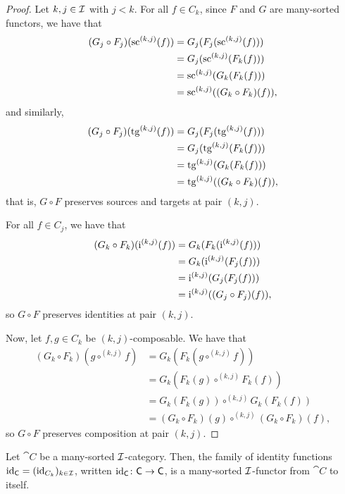 \begin{proof}
  \leanok
  Let $k, j \in \mathcal{I}$ with $j < k$. For all $f \in C_k$, since $F$ and $G$ are many-sorted
  functors, we have that
  \[
    \begin{split}
      (G_j \circ F_j) (\operatorname{sc}^{(k,j)} (f))
      & = G_j (F_j (\operatorname{sc}^{(k,j)} (f))) \\
      & = G_j (\operatorname{sc}^{(k,j)} (F_k (f))) \\
      & = \operatorname{sc}^{(k,j)} (G_k (F_k (f))) \\
      & = \operatorname{sc}^{(k,j)} ((G_k \circ F_k) (f)),
    \end{split}
  \]
  and similarly,
  \[
    \begin{split}
      (G_j \circ F_j) (\operatorname{tg}^{(k,j)} (f))
      & = G_j (F_j (\operatorname{tg}^{(k,j)} (f))) \\
      & = G_j (\operatorname{tg}^{(k,j)} (F_k (f))) \\
      & = \operatorname{tg}^{(k,j)} (G_k (F_k (f))) \\
      & = \operatorname{tg}^{(k,j)} ((G_k \circ F_k) (f)),
    \end{split}
  \]
  that is, $G \circ F$ preserves sources and targets at pair $(k,j)$.

  For all $f \in C_j$, we have that
  \[
    \begin{split}
      (G_k \circ F_k) (\operatorname{i}^{(k,j)} (f))
      & = G_k (F_k (\operatorname{i}^{(k,j)} (f))) \\
      & = G_k (\operatorname{i}^{(k,j)} (F_j (f))) \\
      & = \operatorname{i}^{(k,j)} (G_j (F_j (f))) \\
      & = \operatorname{i}^{(k,j)} ((G_j \circ F_j) (f)),
    \end{split}
  \]
  so $G \circ F$ preserves identities at pair $(k,j)$.

  Now, let $f, g \in C_k$ be $(k,j)$-composable. We have that
  \[
    \begin{split}
      (G_k \circ F_k) (g \circ^{(k,j)} f)
      & = G_k (F_k (g \circ^{(k,j)} f)) \\
      & = G_k (F_k (g) \circ^{(k,j)} F_k (f)) \\
      & = G_k (F_k (g)) \circ^{(k,j)} G_k (F_k (f)) \\
      & = (G_k \circ F_k) (g) \circ^{(k,j)} (G_k \circ F_k) (f),
    \end{split}
  \]
  so $G \circ F$ preserves composition at pair $(k,j)$.
\end{proof}

\begin{construction}
  \label{def:ManySortedFunctor_id}
  \leanok
  Let $\cat{C}$ be a many-sorted $\mathcal{I}$-category. Then, the family of identity functions
  $\operatorname{id}_{\mathsf{C}} = (\operatorname{id}_{C_k})_{k \in \mathcal{I}}$, written $\operatorname{id}_{\mathsf{C}} \colon \mathsf{C} \to \mathsf{C}$,
  is a many-sorted $\mathcal{I}$-functor from $\cat{C}$ to itself.
\end{construction}

